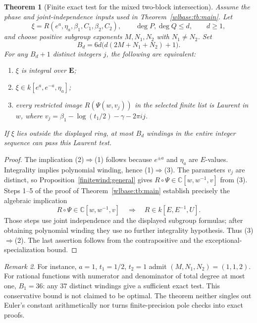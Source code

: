 \documentclass[11pt,a4paper]{article}
\newtheorem{theorem}{Theorem}[section]
\theoremstyle{definition}\newtheorem{definition}[theorem]{Definition}
\theoremstyle{remark}\newtheorem{remark}[theorem]{Remark}
\begin{document}
\begin{theorem}[Finite exact test for the mixed two-block intersection]
\label{finitewind:twoblock}
Assume the phase and joint-independence inputs used in
Theorem~\ref{wlbase:tb:main}. Let
\[
 \xi=R(e^a,\eta_a,\beta_1,C_1,\beta_2,C_2),
 \qquad \deg P,\deg Q\le d,\qquad d\ge1,
\]
and choose positive subgroup exponents $M,N_1,N_2$ with $N_1\ne N_2$.
Set
\[
 B_d=6d\bigl(d(2M+N_1+N_2)+1\bigr).
\]
For any $B_d+1$ distinct integers $j$, the following are equivalent:
\begin{enumerate}
\item $\xi$ is integral over $\mathbf E$;
\item $\xi\in k[e^a,e^{-a},\eta_a]$;
\item every restricted image $R(\Psi(w,v_j))$ in the selected finite
      list is Laurent in $w$, where
      $v_j=\beta_1-\log(t_1/2)-\gamma-2\pi i j$.
\end{enumerate}
If $\xi$ lies outside the displayed ring, at most $B_d$ windings
in the entire integer sequence can pass this Laurent test.
\end{theorem}

\begin{proof}
The implication (2)$\Rightarrow$(1) follows because $e^{\pm a}$ and
$\eta_a$ are $E$-values. Integrality implies polynomial winding, hence
(1)$\Rightarrow$(3). The parameters $v_j$ are distinct, so
Proposition~\ref{finitewind:general} gives
$R\circ\Psi\in\mathbb C[w,w^{-1},v]$ from (3).
Steps 1--5 of the proof of Theorem~\ref{wlbase:tb:main} establish
precisely the algebraic implication
\[
 R\circ\Psi\in\mathbb C[w,w^{-1},v]
       \quad\Longrightarrow\quad R\in k[E,E^{-1},U].
\]
Those steps use joint independence and the displayed subgroup formulas;
after obtaining polynomial winding they use no further integrality
hypothesis. Thus (3)$\Rightarrow$(2). The last assertion follows from
the contrapositive and the exceptional-specialization bound.
\end{proof}

\begin{remark}
For instance, $a=1$, $t_1=1/2$, $t_2=1$ admit
$(M,N_1,N_2)=(1,1,2)$. For rational functions with numerator and
denominator of total degree at most one, $B_1=36$: any $37$ distinct
windings give a sufficient exact test. This conservative bound is not
claimed to be optimal. The theorem neither singles out Euler's constant
arithmetically nor turns finite-precision pole checks into exact proofs.
\end{remark}
\end{document}
